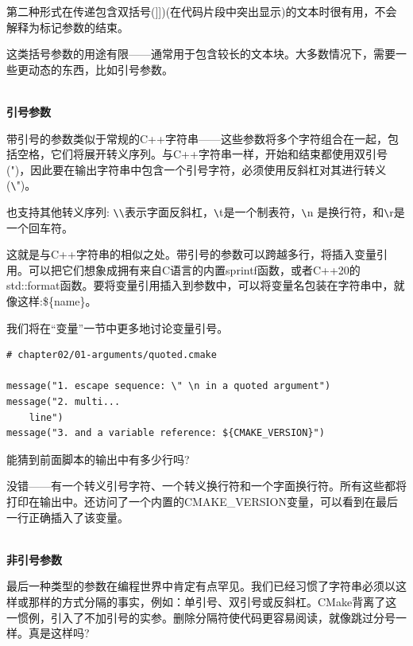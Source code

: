 第二种形式在传递包含双括号(]])(在代码片段中突出显示)的文本时很有用，不会解释为标记参数的结束。

这类括号参数的用途有限——通常用于包含较长的文本块。大多数情况下，需要一些更动态的东西，比如引号参数。

\hspace*{\fill} \\ %
\noindent
\textbf{引号参数}

带引号的参数类似于常规的C++字符串——这些参数将多个字符组合在一起，包括空格，它们将展开转义序列。与C++字符串一样，开始和结束都使用双引号(")，因此要在输出字符串中包含一个引号字符，必须使用反斜杠对其进行转义(\verb|\|")。

也支持其他转义序列: \verb|\|\verb|\|表示字面反斜杠，\verb|\|t是一个制表符，\verb|\|n 是换行符，和\verb|\|r是一个回车符。

这就是与C++字符串的相似之处。带引号的参数可以跨越多行，将插入变量引用。可以把它们想象成拥有来自C语言的内置sprintf函数，或者C++20的std::format函数。要将变量引用插入到参数中，可以将变量名包装在字符串中，就像这样:\$\{name\}。

我们将在“变量”一节中更多地讨论变量引号。

\begin{lstlisting}[style=styleCMake]
# chapter02/01-arguments/quoted.cmake
	
message("1. escape sequence: \" \n in a quoted argument")
message("2. multi...
	line")
message("3. and a variable reference: ${CMAKE_VERSION}")
\end{lstlisting}

能猜到前面脚本的输出中有多少行吗?


没错——有一个转义引号字符、一个转义换行符和一个字面换行符。所有这些都将打印在输出中。还访问了一个内置的CMAKE\_VERSION变量，可以看到在最后一行正确插入了该变量。

\hspace*{\fill} \\ %
\noindent
\textbf{非引号参数}

最后一种类型的参数在编程世界中肯定有点罕见。我们已经习惯了字符串必须以这样或那样的方式分隔的事实，例如：单引号、双引号或反斜杠。CMake背离了这一惯例，引入了不加引号的实参。删除分隔符使代码更容易阅读，就像跳过分号一样。真是这样吗?

